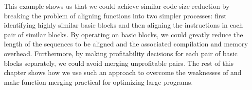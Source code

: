 
This example shows us that we could achieve similar code size reduction by breaking the problem of aligning functions into two simpler processes: first identifying highly similar basic blocks and then aligning the instructions in each pair of similar blocks. 
By operating on basic blocks, we could greatly reduce the length of the sequences to be aligned and the associated compilation and memory overhead. Furthermore, by making profitability decisions for each pair of basic blocks separately, we could avoid merging unprofitable pairs. The rest of this chapter shows how we use such an approach to overcome the weaknesses of \SOAName and make function merging practical for optimizing large programs. 






